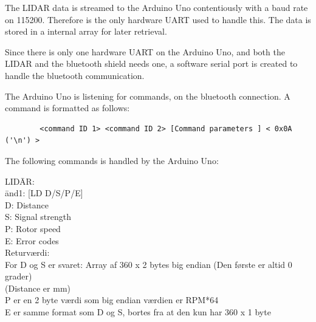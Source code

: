 The LIDAR data is streamed to the Arduino Uno contentiously with a baud rate on 115200. Therefore is the only hardware UART used to handle this. The data is stored in a internal array for later retrieval.

Since there is only one hardware UART on the Arduino Uno, and both the LIDAR and the bluetooth shield needs one, a software serial port is created to handle the bluetooth communication. 

The Arduino Uno is listening for commands, on the bluetooth connection. A command is formatted as follows: 
\begin{verbatim}
		<command ID 1> <command ID 2> [Command parameters ] < 0x0A ('\n') >
\end{verbatim}

The following commands is handled by the Arduino Uno: 

\begin{tabbing}	
{LID}\={AR:}\\
\={and1: [LD D/S/P/E]} \\
\> \> D: Distance \\
\> \> S: Signal strength\\
\> \> P: Rotor speed\\
\> \> E: Error codes\\
\> Returværdi:\\
\> \> {For D og S er svaret: Array af 360 x 2 bytes big endian (Den første er altid 0 grader)} \\ \> \> {(Distance er mm)} \\
\> \> {P er en 2 byte værdi som big endian værdien er RPM*64} \\
\> \> {E er samme format som D og S, bortes fra at den kun har 360 x 1 byte} \\
\end{tabbing}	

  

